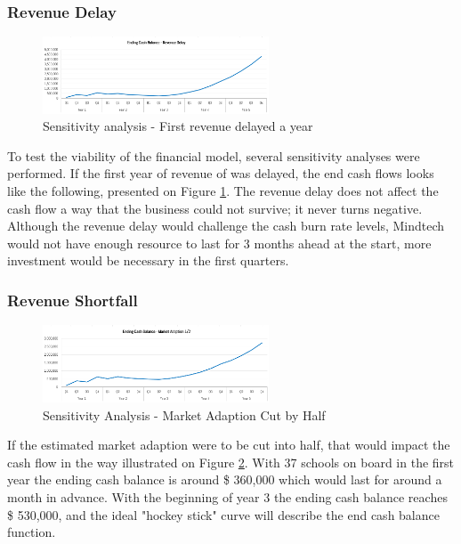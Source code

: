 \documentclass[letterpaper,10pt]{article}
\begin{document}
\subsubsection{Revenue Delay}

\begin{figure}
\centering
\includegraphics[width=0.6\textwidth]{revdelay.PNG}
\caption{Sensitivity analysis - First revenue delayed a year}
\label{img:reldel}
\end{figure}

To test the viability of the financial model, several sensitivity analyses were performed. If the first year of revenue of was delayed, the end cash flows looks like the following, presented on Figure \ref{img:reldel}. The revenue delay does not affect the cash flow a way that the business could not survive; it never turns negative. Although the revenue delay would challenge the cash burn rate levels, Mindtech would not have enough resource to last for 3 months ahead at the start, more investment would be necessary in the first quarters.   

\subsubsection{Revenue Shortfall}

\begin{figure}
\centering
\includegraphics[width=0.6\textwidth]{adoptionghalf.PNG}
\caption{Sensitivity Analysis - Market Adaption Cut by Half}
\label{img:marketcut}
\end{figure}

If the estimated market adaption were to be cut into half, that would impact the cash flow in the way illustrated on Figure \ref{img:marketcut}. With 37 schools on board in the first year the ending cash balance is around \$ 360,000 which would last for around a month in advance. With the beginning of year 3 the ending cash balance reaches \$ 530,000, and the ideal "hockey stick" curve will describe the end cash balance function.  
\end{document}
